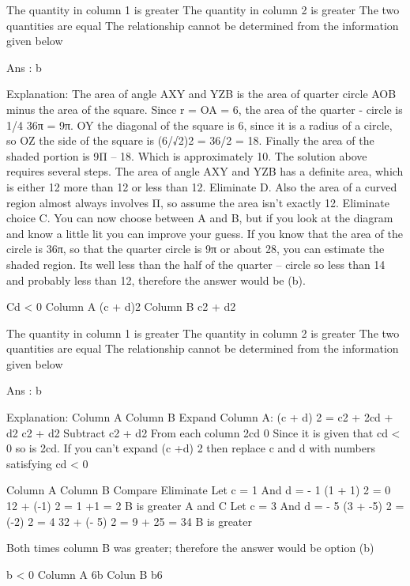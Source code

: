         The quantity in column 1 is greater
        The quantity in column 2 is greater
        The two quantities are equal
        The relationship cannot be determined from the information given below 

    Ans : b

    Explanation:
    The area of angle AXY and YZB is the area of quarter circle AOB minus the area of the square. Since r = OA = 6, the area of the quarter - circle is 1/4 36π = 9π. OY the diagonal of the square is 6, since it is a radius of a circle, so OZ the side of the square is (6/√2)2 = 36/2 = 18. Finally the area of the shaded portion is 9Π – 18. Which is approximately 10. The solution above requires several steps. The area of angle AXY and YZB has a definite area, which is either 12 more than 12 or less than 12. Eliminate D. Also the area of a curved region almost always involves Π, so assume the area isn’t exactly 12. Eliminate choice C. You can now choose between A and B, but if you look at the diagram and know a little lit you can improve your guess. If you know that the area of the circle is 36π, so that the quarter circle is 9π or about 28, you can estimate the shaded region. Its well less than the half of the quarter – circle so less than 14 and probably less than 12, therefore the answer would be (b).

    Cd < 0
    Column A
    (c + d)2
    Column B
    c2 + d2

        The quantity in column 1 is greater
        The quantity in column 2 is greater
        The two quantities are equal
        The relationship cannot be determined from the information given below 

    Ans : b

    Explanation:
    Column A      Column B
    Expand Column A: (c + d) 2 =
    c2 + 2cd + d2 c2 + d2
    Subtract c2 + d2
    From each column      2cd      0
    Since it is given that cd < 0 so is 2cd. If you can’t expand (c +d) 2 then replace c and d with numbers satisfying cd < 0


        Column A    Column B    Compare     Eliminate
    Let c = 1 And d = - 1   (1 + 1) 2 = 0   12 + (-1) 2 = 1 +1 = 2  B is greater    A and C
    Let c = 3 And d = - 5   (3 + -5) 2 = (-2) 2 = 4     32 + (- 5) 2 = 9 + 25 = 34  B is greater      

    Both times column B was greater; therefore the answer would be option (b)

    b < 0
    Column A
    6b
    Colun B
    b6

